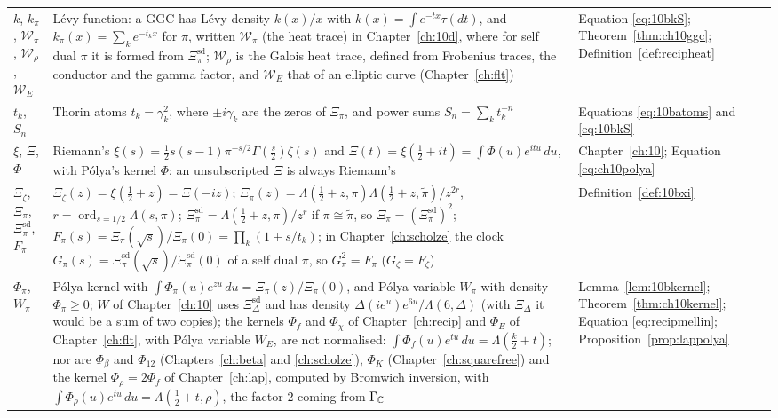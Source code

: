 {\begin{longtable}{p{0.8in}p{2.65in}p{0.95in}}
\raggedright $k$, $k_\pi$, $\mathcal W_\pi$, $\mathcal W_\rho$, $\mathcal W_E$ & \raggedright L\'evy function: a GGC has L\'evy density $k(x)/x$ with $k(x)=\int e^{-tx}\tau(dt)$, and $k_\pi(x)=\sum_ke^{-t_kx}$ for $\pi$, written $\mathcal W_\pi$ (the heat trace) in Chapter~\ref{ch:10d}, where for self dual $\pi$ it is formed from $\Xi^{\mathrm{sd}}_\pi$; $\mathcal W_\rho$ is the Galois heat trace, defined from Frobenius traces, the conductor and the gamma factor, and $\mathcal W_E$ that of an elliptic curve (Chapter~\ref{ch:flt}) & \raggedright Equation \eqref{eq:10bkS}; Theorem~\ref{thm:ch10ggc}; Definition~\ref{def:recipheat}\tabularnewline[1pt]
\raggedright $t_k$, $S_n$ & \raggedright Thorin atoms $t_k=\gamma_k^2$, where $\pm i\gamma_k$ are the zeros of $\Xi_\pi$, and power sums $S_n=\sum_kt_k^{-n}$ & \raggedright Equations \eqref{eq:10batoms} and \eqref{eq:10bkS}\tabularnewline[1pt]
\raggedright $\xi$, $\Xi$, $\Phi$ & \raggedright Riemann's $\xi(s)=\frac12s(s-1)\pi^{-s/2}\Gamma(\frac s2)\zeta(s)$ and $\Xi(t)=\xi(\frac12+it)=\int\Phi(u)e^{itu}\,du$, with P\'olya's kernel $\Phi$; an unsubscripted $\Xi$ is always Riemann's & \raggedright Chapter~\ref{ch:10}; Equation \eqref{eq:ch10polya}\tabularnewline[1pt]
\raggedright $\Xi_\zeta$, $\Xi_\pi$, $\Xi^{\mathrm{sd}}_\pi$, $F_\pi$ & \raggedright $\Xi_\zeta(z)=\xi(\frac12+z)=\Xi(-iz)$; $\Xi_\pi(z)=\Lambda(\frac12+z,\pi)\Lambda(\frac12+z,\tilde\pi)/z^{2r}$, $r=\operatorname{ord}_{s=1/2}\Lambda(s,\pi)$; $\Xi^{\mathrm{sd}}_\pi=\Lambda(\frac12+z,\pi)/z^r$ if $\pi\cong\tilde\pi$, so $\Xi_\pi=(\Xi^{\mathrm{sd}}_\pi)^2$; $F_\pi(s)=\Xi_\pi(\sqrt s)/\Xi_\pi(0)=\prod_k(1+s/t_k)$; in Chapter~\ref{ch:scholze} the clock $G_\pi(s)=\Xi^{\mathrm{sd}}_\pi(\sqrt s)/\Xi^{\mathrm{sd}}_\pi(0)$ of a self dual $\pi$, so $G_\pi^2=F_\pi$ ($G_\zeta=F_\zeta$) & \raggedright Definition~\ref{def:10bxi}\tabularnewline[1pt]
\raggedright $\Phi_\pi$, $W_\pi$ & \raggedright P\'olya kernel with $\int\Phi_\pi(u)e^{zu}\,du=\Xi_\pi(z)/\Xi_\pi(0)$, and P\'olya variable $W_\pi$ with density $\Phi_\pi\ge0$; $W$ of Chapter~\ref{ch:10} uses $\Xi^{\mathrm{sd}}_\Delta$ and has density $\Delta(ie^u)e^{6u}/\Lambda(6,\Delta)$ (with $\Xi_\Delta$ it would be a sum of two copies); the kernels $\Phi_f$ and $\Phi_\chi$ of Chapter~\ref{ch:recip} and $\Phi_E$ of Chapter~\ref{ch:flt}, with P\'olya variable $W_E$, are not normalised: $\int\Phi_f(u)e^{tu}\,du=\Lambda(\frac k2+t)$; nor are $\Phi_\beta$ and $\Phi_{12}$ (Chapters~\ref{ch:beta} and \ref{ch:scholze}), $\Phi_K$ (Chapter~\ref{ch:squarefree}) and the kernel $\Phi_\rho=2\Phi_f$ of Chapter~\ref{ch:lap}, computed by Bromwich inversion, with $\int\Phi_\rho(u)e^{tu}\,du=\Lambda(\frac12+t,\rho)$, the factor $2$ coming from $\Gamma_{\mathbb{C}}$ & \raggedright Lemma~\ref{lem:10bkernel}; Theorem~\ref{thm:ch10kernel}; Equation \eqref{eq:recipmellin}; Proposition~\ref{prop:lappolya}\tabularnewline[1pt]

\end{longtable}}
